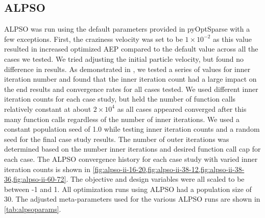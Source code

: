 \documentclass{jpconf}
\begin{document}
\subsection{ALPSO} 
ALPSO was run using the default parameters provided in pyOptSparse \cite{wu2020} with a few exceptions. First, the craziness velocity was set to be $1\times10^{-2}$ as this value resulted in increased optimized AEP compared to the default value across all the cases we tested. We tried adjusting the initial particle velocity, but found no difference in results. As demonstrated in \cite{jansen2011_alpso}, we tested a series of values for inner iteration number and found that the inner iteration count had a large impact on the end results and convergence rates for all cases tested. We used different inner iteration counts for each case study, but held the number of function calls relatively constant at about $2\times 10^4$ as all cases appeared converged after this many function calls regardless of the number of inner iterations. We used a constant population seed of 1.0 while testing inner iteration counts and a random seed for the final case study results. The number of outer iterations was determined based on the number inner iterations and desired function call cap for each case. The ALPSO convergence history for each case study with varied inner iteration counts is shown in \cref{fig:alpso-ii-16-20,fig:alpso-ii-38-12,fig:alpso-ii-38-36,fig:alpso-ii-60-72}. The objective and design variables were all scaled to be between -1 and 1.  All optimization runs using ALPSO had a population size of 30. The adjusted meta-parameters used for the various ALPSO runs are shown in \cref{tab:alpsoparams}.
\end{document}
